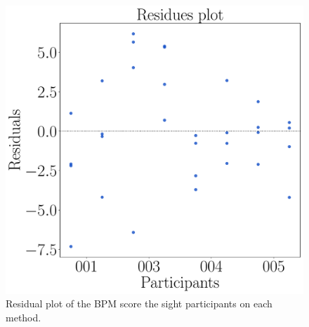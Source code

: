 \begin{figure}[!htb]
    \begin{minipage}{0.45\textwidth}
        \centering
        \includegraphics[width = \textwidth]{Resultados/ECG/Figuras/pdf/residplot_bpm_two_way_sight.pdf}
        \caption{Residual plot of the BPM score the sight participants on each method.}
        \label{fig:residplot_bpm_two_way_sight}
    \end{minipage}
\end{figure}

%



\FloatBarrier

%
%
